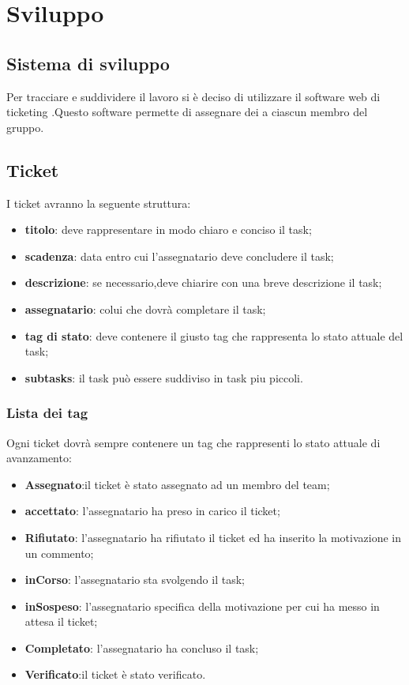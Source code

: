 \section{Sviluppo}
	\subsection{Sistema di sviluppo}
	Per tracciare e suddividere il lavoro si è deciso di utilizzare il software web di ticketing .Questo software permette di assegnare dei  a ciascun membro del gruppo.
	\subsection{Ticket}
	I ticket avranno la seguente struttura:
	\begin{itemize}
		\item \textbf{titolo}: deve rappresentare in modo chiaro e conciso il task;
		\item \textbf{scadenza}: data entro cui l'assegnatario deve concludere il task;
		\item \textbf{descrizione}: se necessario,deve chiarire con una breve descrizione il task;
		\item \textbf{assegnatario}: colui che dovrà completare il task;
		\item \textbf{tag di stato}: deve contenere il giusto tag che rappresenta lo stato attuale del task; 
		\item \textbf{subtasks}: il task può essere suddiviso in task piu piccoli.
	\end{itemize}
		\subsubsection{Lista dei tag}
		Ogni ticket dovrà sempre contenere un tag che rappresenti lo stato attuale di avanzamento:
		\begin{itemize}
			\item \textbf{Assegnato}:il ticket è stato assegnato ad un membro del team;
			\item \textbf{accettato}: l'assegnatario ha preso in carico il ticket;
			\item \textbf{Rifiutato}: l'assegnatario ha rifiutato il ticket ed ha inserito la motivazione in un commento;
			\item \textbf{inCorso}: l'assegnatario sta svolgendo il task;
			\item \textbf{inSospeso}: l'assegnatario specifica della motivazione per cui ha messo in attesa il ticket;
			\item \textbf{Completato}: l'assegnatario ha concluso il task;
			\item \textbf{Verificato}:il ticket è stato verificato.
		\end{itemize}
